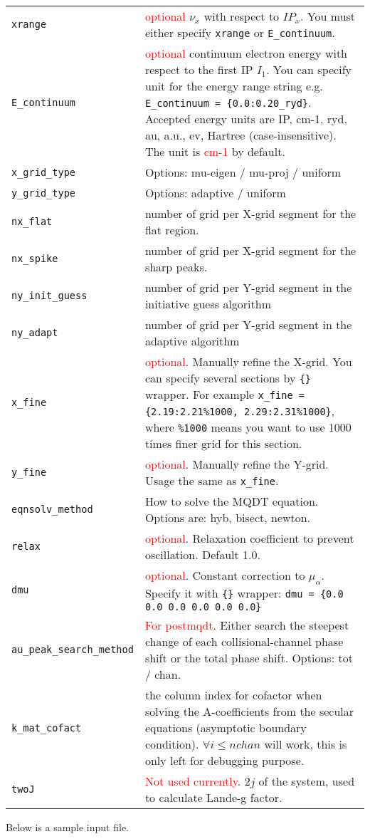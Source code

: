 \documentclass[11pt]{article}
\begin{document}
\begin{table}[]
\begin{tabular}{|p{5cm}|p{10.5cm}|}
		\verb|xrange|& \textcolor{red}{optional} $\nu_x$ with respect to $IP_x$. You must either specify \verb|xrange| or \verb|E_continuum|.\\
		\verb|E_continuum|&\textcolor{red}{optional} continuum electron energy with respect to the first IP $I_1$. You can specify unit for the energy range string e.g. \verb|E_continuum = {0.0:0.20_ryd}|. Accepted energy units are IP, cm-1, ryd, au, a.u., ev, Hartree (case-insensitive). The unit is \textcolor{red}{cm-1} by default.\\
		\verb|x_grid_type|& Options: mu-eigen / mu-proj / uniform\\
		\verb|y_grid_type|& Options: adaptive / uniform\\
		\verb|nx_flat|& number of grid per X-grid segment for the flat region.\\
		\verb|nx_spike|& number of grid per X-grid segment for the sharp peaks.\\
		\verb|ny_init_guess|& number of grid per Y-grid segment in the initiative guess algorithm\\
		\verb|ny_adapt|& number of grid per Y-grid segment in the adaptive algorithm\\
		\verb|x_fine|& \textcolor{red}{optional}. Manually refine the X-grid. You can specify several sections by \verb|{}| wrapper. For example \verb|x_fine = {2.19:2.21%1000, 2.29:2.31%1000}|, where \verb|%1000| means you want to use 1000 times finer grid for this section.\\
		\verb|y_fine|& \textcolor{red}{optional}. Manually refine the Y-grid. Usage the same as \verb|x_fine|.\\
		\verb|eqnsolv_method|& How to solve the MQDT equation. Options are: hyb, bisect, newton.\\
		\verb|relax|& \textcolor{red}{optional}. Relaxation coefficient to prevent oscillation. Default 1.0. \\
		\verb|dmu|& \textcolor{red}{optional}. Constant correction to $\mu_{\alpha}$. Specify it with \verb|{}| wrapper: \verb|dmu = {0.0 0.0 0.0 0.0 0.0 0.0}| \\
		\verb|au_peak_search_method|& \textcolor{red}{For postmqdt}. Either search the steepest change of each collisional-channel phase shift or the total   phase shift. Options: tot / chan. \\
		\verb|k_mat_cofact|& the column index for cofactor when solving the A-coefficients from the secular equations (asymptotic boundary condition).
		$\forall i \leq nchan$ will work, this is only left for debugging purpose. \\
		\verb|twoJ|& \textcolor{red}{Not used currently}. $2j$ of the system, used to calculate Lande-g factor.\\
		\hline
	\end{tabular}
\end{table}
Below is a sample input file.
\newpage
\end{document}
